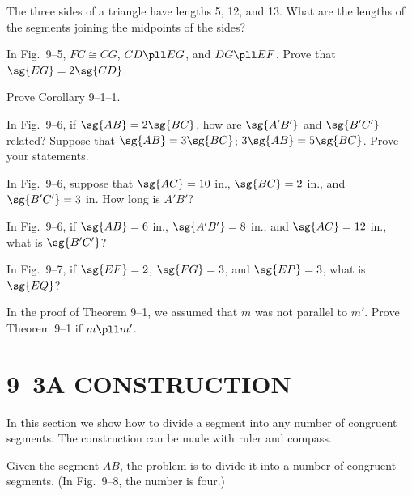 \documentclass[11pt]{book}
\theoremstyle{bkplain}
\theoremstyle{XIplainnote}
\theoremstyle{bkplain}
\theoremstyle{bkplain}
\begin{document}
\begin{exercisecols}
\begin{exlist}
\item The three sides of a triangle have lengths 5, 12, and 13. What are the
      lengths of the segments joining the midpoints of the sides?
\item In Fig.~9--5, $FC \cong CG$, $CD \pll EG$, and $DG \pll EF$. Prove that
      $\sg{EG} = 2\sg{CD}$.
\exfig{\FIGIXFIVE}
\item Prove Corollary 9--1--1.
\item In Fig.~9--6, if $\sg{AB} = 2\sg{BC}$, how are $\sg{A'B'}$ and
      $\sg{B'C'}$ related? Suppose that $\sg{AB} = 3\sg{BC}$; $3\sg{AB} =
      5\sg{BC}$. Prove your statements.
\exfig{\FIGIXSIX}
\item In Fig.~9--6, suppose that $\sg{AC} = 10$ in., $\sg{BC} = 2$ in., and
      $\sg{B'C'} = 3$ in. How long is $A'B'$?
\item In Fig.~9--6, if $\sg{AB} = 6$ in., $\sg{A'B'} = 8$ in., and $\sg{AC} =
      12$ in., what is $\sg{B'C'}$?
\item In Fig.~9--7, if $\sg{EF} = 2$, $\sg{FG} = 3$, and $\sg{EP} = 3$, what is
      $\sg{EQ}$?
\exfig{\FIGIXSEVEN}
\item In the proof of Theorem 9--1, we assumed that $m$ was not parallel to
      $m'$. Prove Theorem 9--1 if $m \pll m'$.
\end{exlist}
\end{exercisecols}

\section*{9--3\quad A CONSTRUCTION}

In this section we show how to divide a segment into any number of congruent
segments. The construction can be made with ruler and compass.

\FIGIXEIGHT

\begin{construction}
Given the segment $AB$, the problem is to divide it into a number of congruent
segments. (In Fig.~9--8, the number is four.)
\end{construction}

\begin{steps}
\end{steps}
\end{document}
